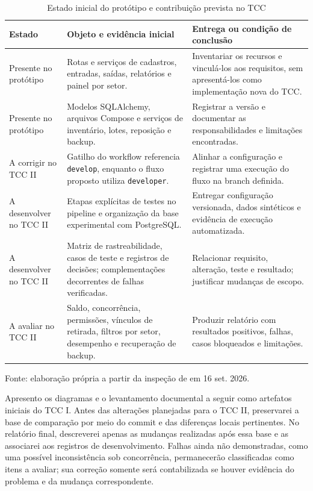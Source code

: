 \begin{table}[htb]
\centering
\caption{Estado inicial do protótipo e contribuição prevista no TCC}
\label{tab:estado-contribuicao}
\small
\begin{tabular}{p{}p{}p{}}
\hline
\textbf{Estado} & \textbf{Objeto e evidência inicial} & \textbf{Entrega ou condição de conclusão} \\ \hline
Presente no protótipo & Rotas e serviços de cadastros, entradas, saídas, relatórios e painel por setor. & Inventariar os recursos e vinculá-los aos requisitos, sem apresentá-los como implementação nova do TCC. \\ \hline
Presente no protótipo & Modelos SQLAlchemy, arquivos Compose e serviços de inventário, lotes, reposição e backup. & Registrar a versão e documentar as responsabilidades e limitações encontradas. \\ \hline
A corrigir no TCC II & Gatilho do workflow referencia \texttt{develop}, enquanto o fluxo proposto utiliza \texttt{developer}. & Alinhar a configuração e registrar uma execução do fluxo na branch definida. \\ \hline
A desenvolver no TCC II & Etapas explícitas de testes no pipeline e organização da base experimental com PostgreSQL. & Entregar configuração versionada, dados sintéticos e evidência de execução automatizada. \\ \hline
A desenvolver no TCC II & Matriz de rastreabilidade, casos de teste e registros de decisões; complementações decorrentes de falhas verificadas. & Relacionar requisito, alteração, teste e resultado; justificar mudanças de escopo. \\ \hline
A avaliar no TCC II & Saldo, concorrência, permissões, vínculos de retirada, filtros por setor, desempenho e recuperação de backup. & Produzir relatório com resultados positivos, falhas, casos bloqueados e limitações. \\ \hline
\end{tabular}
\par\smallskip
{\footnotesize Fonte: elaboração própria a partir da inspeção de \cite{EstoqueFacilRepositorio} em 16 set. 2026.}
\end{table}

Apresento os diagramas e o levantamento documental a seguir como artefatos iniciais do TCC I. Antes das alterações planejadas para o TCC II, preservarei a base de comparação por meio do commit e das diferenças locais pertinentes. No relatório final, descreverei apenas as mudanças realizadas após essa base e as associarei aos registros de desenvolvimento. Falhas ainda não demonstradas, como uma possível inconsistência sob concorrência, permanecerão classificadas como itens a avaliar; sua correção somente será contabilizada se houver evidência do problema e da mudança correspondente.

